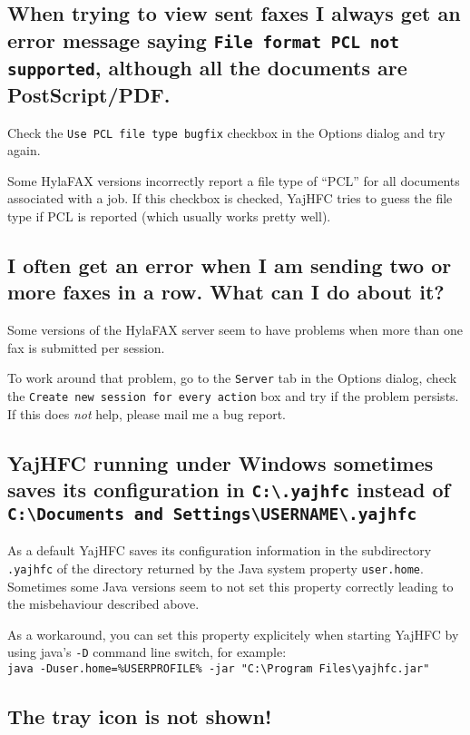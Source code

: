 \documentclass[a4paper,10pt]{scrartcl}
\begin{document}
\subsection{When trying to view sent faxes I always get an error message saying 
   \texttt{File format PCL not supported}, although all the documents are PostScript/PDF.}

Check the \texttt{Use PCL file type bugfix} checkbox in the Options dialog and try again.

Some HylaFAX versions incorrectly report a file type of ``PCL'' for all documents
associated with a job. If this checkbox is checked, YajHFC tries to guess the
file type if PCL is reported (which usually works pretty well).

\subsection{I often get an error when I am sending two or more faxes in a row. What can I do about it?}

Some versions of the HylaFAX server seem to have problems when more than one fax is submitted per session.

To work around that problem, go to the \texttt{Server} tab in the Options dialog, check the \texttt{Create new session for every action} box and try if the problem persists.
If this does \emph{not} help, please mail me a bug report.

\subsection{YajHFC running under Windows sometimes saves its configuration in \texttt{C:\textbackslash .yajhfc} instead of \texttt{C:\textbackslash Documents and Settings\textbackslash USERNAME\textbackslash .yajhfc}}

As a default YajHFC saves its configuration information in the subdirectory \texttt{.yajhfc} of the directory returned by
the Java system property \texttt{user.home}.
Sometimes some Java versions seem to not set this property correctly leading to the misbehaviour described above.

As a workaround, you can set this property explicitely when starting YajHFC by using java's \texttt{-D} command line switch, for example: \\
\texttt{java -Duser.home=\%USERPROFILE\% -jar "C:\textbackslash Program Files\textbackslash yajhfc.jar"}

\subsection{The tray icon is not shown!}
\end{document}
